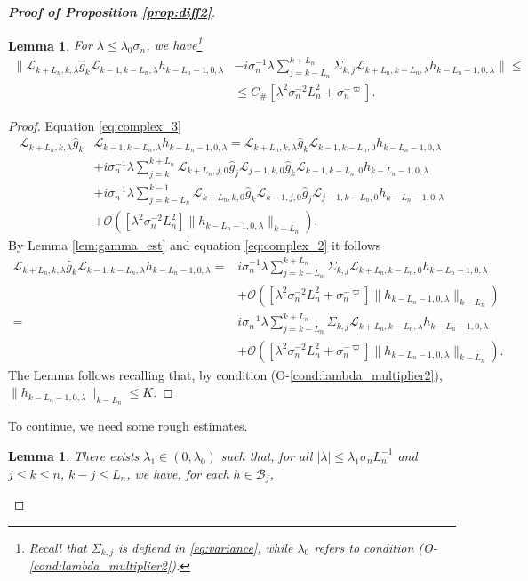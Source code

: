 \documentclass{amsart}
\numberwithin{equation}{section}
\newtheorem{lem}[thm]{Lemma}
\newcommand\cB{{\mathcal B}}
\newcommand\cL{{\mathcal L}}
\newcommand\cO{{\mathcal O}}
\newcommand{\Const}{C_{\#}}
\begin{document}
\begin{proof}[\bf \em  Proof of Proposition \ref{prop:diff2}]
\begin{lem}\label{lem:apriori} 
For $\lambda\leq \lambda_0\sigma_n$, we have\footnote{ Recall that $\Sigma_{k,j}$ is defiend in \eqref{eq:variance}, while $\lambda_0$ refers to condition (O-\ref{cond:lambda_multiplier2}).}
\[
\begin{split}
\Big\|\cL_{k+L_n,k,\lambda}\hat g_k\cL_{k-1,k-L_n,\lambda}h_{k-L_n-1,0,\lambda}&-i\sigma_n^{-1}\lambda\!\!\!\sum_{j=k-L_n}^{k+L_n} \!\!\!\Sigma_{k,j}\cL_{k+L_n,k-L_n,\lambda}h_{k-L_n-1,0,\lambda}\Big\|\leq\\
&\leq  \Const\left[\lambda^2\sigma_n^{-2}L_n^2+\sigma_n^{-\varpi}\right].
\end{split}
\]
\end{lem}
\begin{proof}
Equation \eqref{eq:complex_3}
\[
\begin{split}
\cL_{k+L_n,k,\lambda}\hat g_k&\cL_{k-1,k-L_n,\lambda}h_{k-L_n-1,0,\lambda}
=\cL_{k+L_n,k,\lambda}\hat g_k\cL_{k-1,k-L_n,0}h_{k-L_n-1,0,\lambda}\\
&+ i\sigma_n^{-1}\lambda\sum_{j=k}^{k+L_n} \cL_{k+L_n,j,0}\hat g_j\cL_{j-1,k,0}\hat g_k\cL_{k-1,k-L_n,0}h_{k-L_n-1,0,\lambda}\\
&+ i\sigma_n^{-1}\lambda\sum_{j=k-L_n}^{k-1} \cL_{k+L_n,k,0}\hat g_k\cL_{k-1,j,0}\hat g_j\cL_{j-1,k-L_n,0}h_{k-L_n-1,0,\lambda}\\
&+\cO(\left[\lambda^2\sigma_n^{-2}L_n^2\right]\|h_{k-L_n-1,0,\lambda}\|_{k-L_n}).
\end{split}
\]
By Lemma \ref{lem:gamma_est} and equation \eqref{eq:complex_2} it follows
\[
\begin{split}
\cL_{k+L_n,k,\lambda}\hat g_k\cL_{k-1,k-L_n,\lambda}h_{k-L_n-1,0,\lambda}
=& i\sigma_n^{-1}\lambda\sum_{j=k-L_n}^{k+L_n} \Sigma_{k,j}\cL_{k+L_n,k-L_n,0}h_{k-L_n-1,0,\lambda}\\
&+\cO(\left[\lambda^2\sigma_n^{-2}L_n^2+\sigma_n^{-\varpi}\right]\|h_{k-L_n-1,0,\lambda}\|_{k-L_n})\\
=&i\sigma_n^{-1}\lambda\sum_{j=k-L_n}^{k+L_n} \Sigma_{k,j}\cL_{k+L_n,k-L_n,\lambda}h_{k-L_n-1,0,\lambda}\\
&+\cO(\left[\lambda^2\sigma_n^{-2}L_n^2+\sigma_n^{-\varpi}\right]\|h_{k-L_n-1,0,\lambda}\|_{k-L_n}).
\end{split}
\]
The Lemma follows recalling that, by condition (O-\ref{cond:lambda_multiplier2}), $\|h_{k-L_n-1,0,\lambda}\|_{k-L_n}\leq K$.
\end{proof}
 To continue, we need some rough estimates.
\begin{lem}\label{lem:rough}
There exists $\lambda_1\in (0,\lambda_0)$ such that, for all $|\lambda|\leq \lambda_1\sigma_n L_n^{-1}$ and $j\leq k\leq n$, $k-j\leq L_n$, we have, for each $h\in\cB_j$,


\end{lem}
\end{proof}
\end{document}
